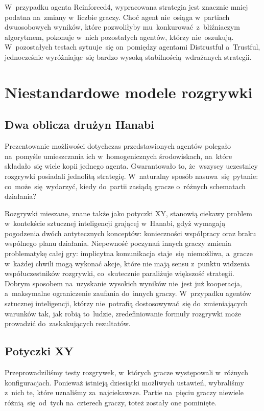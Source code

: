\documentclass[declaration,shortabstract,inz]{iithesis}
\begin{document}
W~przypadku agenta Reinforced4, wypracowana strategia jest znacznie mniej podatna na~zmiany w~liczbie graczy. Choć agent nie~osiąga w~partiach dwuosobowych wyników, które pozwoliłyby mu~konkurować z~bliźniaczym algorytmem, pokonuje w~nich pozostałych agentów, którzy nie~oszukują. W~pozostałych testach sytuuje~się on~pomiędzy agentami Distrustful a~Trustful, jednocześnie wyróżniając~się bardzo wysoką stabilnością wdrażanych strategii.

\chapter{Niestandardowe modele rozgrywki}

\section{Dwa oblicza drużyn Hanabi}

Prezentowanie możliwości dotychczas przedstawionych agentów polegało na~pomyśle umieszczania ich w~homogenicznych środowiskach, na~które składało~się wiele kopii jednego agenta. Gwarantowało to, że~wszyscy uczestnicy rozgrywki posiadali jednolitą strategię. W~naturalny sposób nasuwa~się pytanie: co~może~się wydarzyć, kiedy do~partii zasiądą gracze o~różnych schematach działania?

Rozgrywki mieszane, znane także jako potyczki XY, stanowią ciekawy problem w~kontekście sztucznej inteligencji grającej w~Hanabi, gdyż wymagają pogodzenia dwóch antytecznych konceptów: konieczności współpracy oraz braku wspólnego planu działania. Niepewność poczynań innych graczy zmienia problematykę całej gry: implicytna komunikacja staje~się niemożliwa, a~gracze w~każdej chwili mogą wykonać akcje, które nie mają sensu z~punktu widzenia współuczestników rozgrywki, co~skutecznie paraliżuje większość strategii. Dobrym sposobem na~uzyskanie wysokich wyników nie~jest już kooperacja, a~maksymalne ograniczenie zaufania do~innych graczy. W~przypadku agentów sztucznej inteligencji, którzy nie~potrafią dostosowywać~się do~zmieniających warunków tak, jak robią to~ludzie, zredefiniowanie formuły rozgrywki może prowadzić do~zaskakujących rezultatów.

\section{Potyczki XY}

Przeprowadziliśmy testy rozgrywek, w~których gracze występowali w~różnych konfiguracjach. Ponieważ istnieją dziesiątki możliwych ustawień, wybraliśmy z~nich te, które uznaliśmy za~najciekawsze. Partie na~pięciu graczy niewiele różnią~się od~tych na~czterech graczy, toteż zostały one pominięte.
\end{document}
